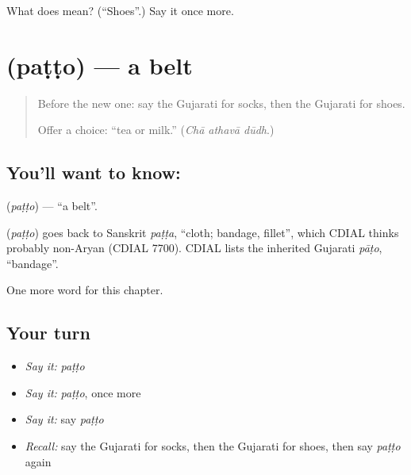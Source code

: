 \begin{tcolorbox}[breakable,colback=teal!4,colframe=teal!35!black,title={Before you move on}]
What does  mean? (\textquotedblleft{}Shoes\textquotedblright{}.) Say it once more.
\end{tcolorbox}
\section[\texorpdfstring{\gu{પટ્ટો} (paṭṭo)}{પટ્ટો (paṭṭo)}]{ (paṭṭo) — a belt}

\label{lesson:GU-C112-patto}



\begin{quote}
Before the new one: say the Gujarati for socks, then the Gujarati for shoes.

Offer a choice: \textquotedblleft{}tea or milk.\textquotedblright{} (\emph{Chā athavā dūdh}.)
\end{quote}

\subsection*{You'll want to know: }
\textbf{} (\emph{paṭṭo}) — \textquotedblleft{}a belt\textquotedblright{}.

\begin{cousinweb}
\textbf{} (\emph{paṭṭo}) goes back to Sanskrit \emph{paṭṭa}, \textquotedblleft{}cloth; bandage, fillet\textquotedblright{}, which CDIAL thinks probably non-Aryan (CDIAL 7700). CDIAL lists the inherited Gujarati \emph{pāṭo}, \textquotedblleft{}bandage\textquotedblright{}.
\end{cousinweb}

\begin{grammarlens}[title={What you've built}]
One more word for this chapter.
\end{grammarlens}

\subsection*{Your turn}
\begin{itemize}
\raggedright
  \item \emph{Say it:} \emph{paṭṭo}
  \item \emph{Say it:} \emph{paṭṭo}, once more
  \item \emph{Say it:} say \emph{paṭṭo}
  \item \emph{Recall:} say the Gujarati for socks, then the Gujarati for shoes, then say \emph{paṭṭo} again
\end{itemize}

